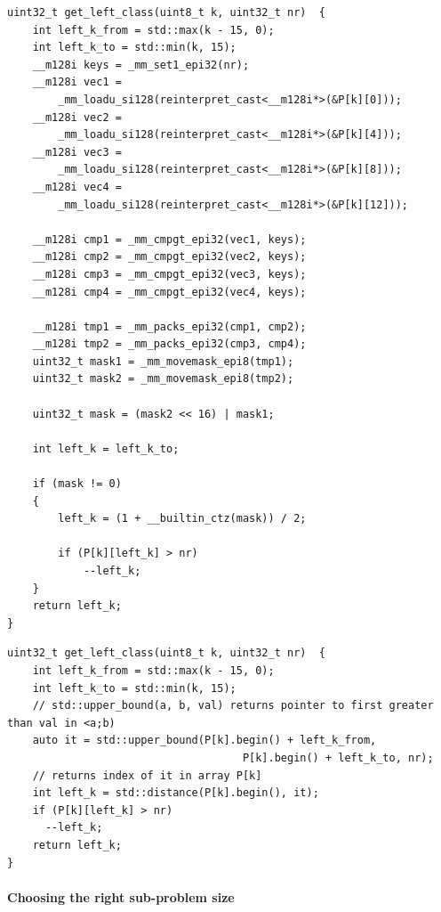\begin{lstlisting}
uint32_t get_left_class(uint8_t k, uint32_t nr)  {
	int left_k_from = std::max(k - 15, 0);
	int left_k_to = std::min(k, 15);
	__m128i keys = _mm_set1_epi32(nr);
	__m128i vec1 =
		_mm_loadu_si128(reinterpret_cast<__m128i*>(&P[k][0]));
	__m128i vec2 =
		_mm_loadu_si128(reinterpret_cast<__m128i*>(&P[k][4]));
	__m128i vec3 =
		_mm_loadu_si128(reinterpret_cast<__m128i*>(&P[k][8]));
	__m128i vec4 =
		_mm_loadu_si128(reinterpret_cast<__m128i*>(&P[k][12]));

	__m128i cmp1 = _mm_cmpgt_epi32(vec1, keys);
	__m128i cmp2 = _mm_cmpgt_epi32(vec2, keys);
	__m128i cmp3 = _mm_cmpgt_epi32(vec3, keys);
	__m128i cmp4 = _mm_cmpgt_epi32(vec4, keys);

	__m128i tmp1 = _mm_packs_epi32(cmp1, cmp2);
	__m128i tmp2 = _mm_packs_epi32(cmp3, cmp4);
	uint32_t mask1 = _mm_movemask_epi8(tmp1);
	uint32_t mask2 = _mm_movemask_epi8(tmp2);

	uint32_t mask = (mask2 << 16) | mask1;

	int left_k = left_k_to;

	if (mask != 0)
	{
		left_k = (1 + __builtin_ctz(mask)) / 2;

		if (P[k][left_k] > nr)
			--left_k;
	}
	return left_k;
}
\end{lstlisting}

\begin{lstlisting}
uint32_t get_left_class(uint8_t k, uint32_t nr)  {
	int left_k_from = std::max(k - 15, 0);
	int left_k_to = std::min(k, 15);
	// std::upper_bound(a, b, val) returns pointer to first greater than val in <a;b) 
	auto it = std::upper_bound(P[k].begin() + left_k_from,
                                     P[k].begin() + left_k_to, nr);
	// returns index of it in array P[k]
    int left_k = std::distance(P[k].begin(), it);
    if (P[k][left_k] > nr)
      --left_k;
	return left_k;
}
\end{lstlisting}

\paragraph{Choosing the right sub-problem size}

